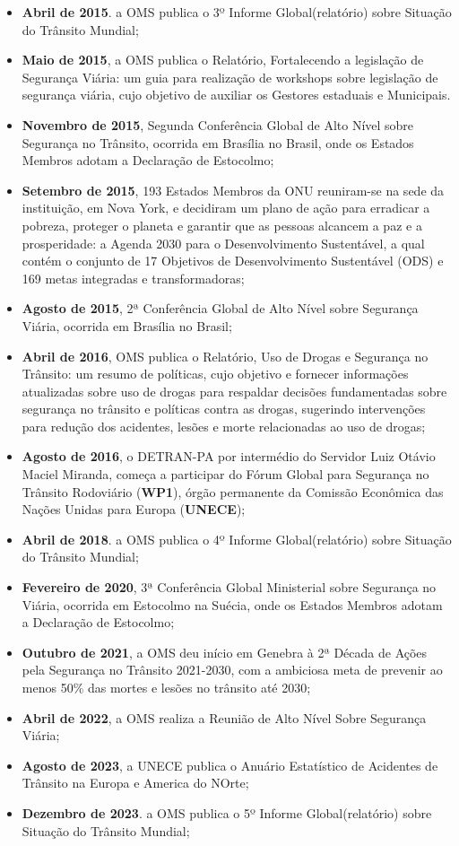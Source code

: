 \documentclass[output=paper,colorlinks,citecolor=green]{langscibook}
\begin{document}
\begin{itemize}
\item \textbf{Abril de 2015}. a OMS publica o 3º Informe Global(relatório) sobre Situação do Trânsito Mundial;
\item \textbf{Maio de 2015}, a OMS publica o Relatório, Fortalecendo a legislação de Segurança Viária: um guia para realização de workshops sobre legislação de segurança viária, cujo objetivo de auxiliar os Gestores estaduais e Municipais.
\item \textbf{Novembro de 2015}, Segunda Conferência Global de Alto Nível sobre Segurança no Trânsito, ocorrida em Brasília no Brasil, onde os Estados Membros adotam a Declaração de Estocolmo;
\item \textbf{Setembro de 2015}, 193 Estados Membros da ONU reuniram-se na sede da instituição, em Nova York, e decidiram um plano de ação para erradicar a pobreza, proteger o planeta e garantir que as pessoas alcancem a paz e a prosperidade: a Agenda 2030 para o Desenvolvimento Sustentável, a qual contém o conjunto de 17 Objetivos de Desenvolvimento Sustentável (ODS) e 169 metas integradas e transformadoras;
\item \textbf{Agosto de 2015}, 2ª Conferência Global de Alto Nível sobre Segurança Viária, ocorrida em Brasília no Brasil;
\item \textbf{Abril de 2016}, OMS publica o Relatório, Uso de Drogas e Segurança no Trânsito: um resumo de políticas, cujo objetivo e fornecer informações atualizadas sobre uso de drogas para respaldar decisões fundamentadas sobre segurança no trânsito e políticas contra as drogas, sugerindo intervenções para redução dos acidentes, lesões e morte relacionadas ao uso de drogas;

\item \textbf{Agosto de 2016}, o DETRAN-PA por intermédio do Servidor Luiz Otávio Maciel Miranda, começa a participar do Fórum Global para Segurança no Trânsito Rodoviário (\textbf{WP1}), órgão permanente da Comissão Econômica das Nações Unidas para Europa (\textbf{UNECE});
\item \textbf{Abril de 2018}. a OMS publica o 4º Informe Global(relatório) sobre Situação do Trânsito Mundial;
\item \textbf{Fevereiro de 2020}, 3ª Conferência Global Ministerial sobre Segurança no Viária, ocorrida em Estocolmo na Suécia, onde os Estados Membros adotam a Declaração de Estocolmo;

\item \textbf{Outubro de 2021}, a OMS deu início em Genebra à 2ª Década de Ações pela Segurança no Trânsito 2021-2030, com a ambiciosa meta de prevenir ao menos 50\% das mortes e lesões no trânsito até 2030;
\item \textbf{Abril de 2022}, a OMS realiza a Reunião de Alto Nível Sobre Segurança Viária;
\item \textbf{Agosto de 2023}, a UNECE publica o Anuário Estatístico de Acidentes de Trânsito na Europa e America do NOrte;
\item \textbf{Dezembro de 2023}. a OMS publica o 5º Informe Global(relatório) sobre Situação do Trânsito Mundial;

\end{itemize}
\end{document}
